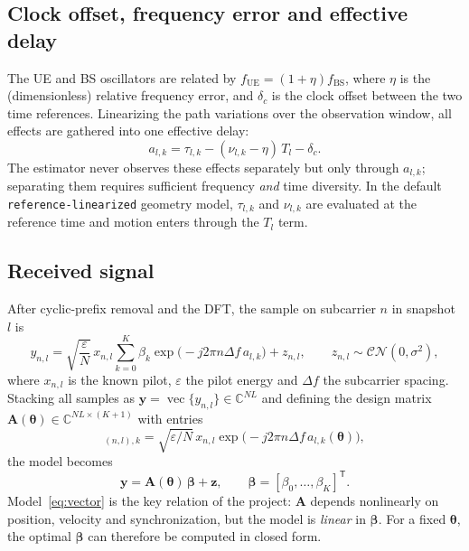 \documentclass[11pt,a4paper]{article}
\newcommand{\vect}[1]{\bm{#1}}
\newcommand{\T}{\mathsf{T}}
\begin{document}
\subsection{Clock offset, frequency error and effective delay}
The UE and BS oscillators are related by $f_{\mathrm{UE}}=(1+\eta)f_{\mathrm{BS}}$, where $\eta$ is the
(dimensionless) relative frequency error, and $\delta_c$ is the clock offset between the two time references.
Linearizing the path variations over the observation window, all effects are gathered into one effective delay:
\begin{equation}
a_{l,k}=\tau_{l,k}-(\nu_{l,k}-\eta)\,T_l-\delta_c .
\label{eq:effdelay}
\end{equation}
The estimator never observes these effects separately but only through $a_{l,k}$; separating them requires
sufficient frequency \emph{and} time diversity. In the default \texttt{reference-linearized} geometry model,
$\tau_{l,k}$ and $\nu_{l,k}$ are evaluated at the reference time and motion enters through the $T_l$ term.

\subsection{Received signal}
After cyclic-prefix removal and the DFT, the sample on subcarrier $n$ in snapshot $l$ is
\begin{equation}
y_{n,l}=\sqrt{\frac{\varepsilon}{N}}\,x_{n,l}\sum_{k=0}^{K}\beta_k\exp\bigl(-j2\pi n\Delta f\,a_{l,k}\bigr)
+z_{n,l},\qquad z_{n,l}\sim\mathcal{CN}(0,\sigma^2),
\label{eq:rx}
\end{equation}
where $x_{n,l}$ is the known pilot, $\varepsilon$ the pilot energy and $\Delta f$ the subcarrier spacing.
Stacking all samples as $\vect{y}=\operatorname{vec}\{y_{n,l}\}\in\mathbb{C}^{NL}$ and defining the design
matrix $\vect{A}(\vect{\theta})\in\mathbb{C}^{NL\times(K+1)}$ with entries
\begin{equation}
[\vect{A}(\vect{\theta})]_{(n,l),k}=\sqrt{\varepsilon/N}\,x_{n,l}\exp\bigl(-j2\pi n\Delta f\,a_{l,k}(\vect{\theta})\bigr),
\end{equation}
the model becomes
\begin{equation}
\vect{y}=\vect{A}(\vect{\theta})\,\vect{\beta}+\vect{z},\qquad
\vect{\beta}=[\beta_0,\dots,\beta_K]^{\T}.
\label{eq:vector}
\end{equation}
Model~\eqref{eq:vector} is the key relation of the project: $\vect{A}$ depends nonlinearly on position, velocity
and synchronization, but the model is \emph{linear} in $\vect{\beta}$. For a fixed $\vect{\theta}$, the optimal
$\vect{\beta}$ can therefore be computed in closed form.
\end{document}
